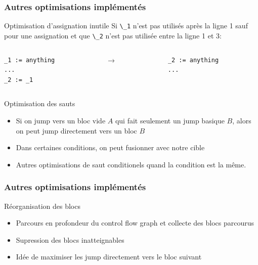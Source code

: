 \documentclass{beamer}
\newcommand*{\local}[1]{\lstinline|\_#1|}
\begin{document}
\begin{frame}[fragile]
    \frametitle{Autres optimisations implémentés}
    \begin{block}{Optimisation d'assignation inutile}
        Si \local{1} n'est pas utilisés après la ligne 1 sauf pour une assignation et que \local{2} 
        n'est pas utilisée entre la ligne 1 et 3:
        \begin{columns}
            \begin{column}{.40\textwidth}
                    \begin{lstlisting}
_1 := anything
...
_2 := _1
                    \end{lstlisting}
            \end{column}

            \begin{column}{.04\textwidth}
                $\rightarrow$
            \end{column}
            \begin{column}{.40\textwidth}
                    \begin{lstlisting}
_2 := anything
...
                    \end{lstlisting}
            \end{column}
        \end{columns}
    \end{block}
    \pause
    \begin{block}{Optimisation des sauts}
        \begin{itemize}
            \item Si on jump vers un bloc vide $A$ qui fait seulement un jump basique $B$, alors on peut jump directement vers un bloc $B$ 
            \item Dans certaines conditions, on peut fusionner avec notre cible
            \item Autres optimisations de saut conditionels quand la condition est la même.
        \end{itemize}
    \end{block}
\end{frame}

\begin{frame}
    \frametitle{Autres optimisations implémentés}

    \begin{block}{Réorganisation des blocs}
        \begin{itemize}
            \item Parcours en profondeur du control flow graph et collecte des blocs parcourus
            \item Supression des blocs inatteignables
            \item Idée de maximiser les jump directement vers le bloc suivant
        \end{itemize}
        
    \end{block}
\end{frame}
\end{document}
